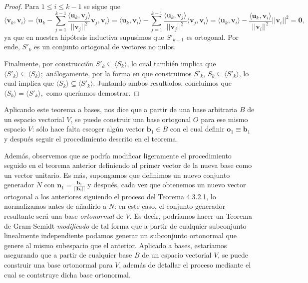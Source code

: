 \documentclass[12pt,dvipsnames]{article}
\newenvironment{teorema}[2][Teorema]{\begin{trivlist}
\item[\hskip \labelsep {\bfseries #1}\hskip \labelsep {\bfseries #2.}]}{\end{trivlist}}
\begin{document}
\begin{teorema} {4.3.2.1 (Gram-Schmidt)}
\begin{proof}
    Para $1\leq i\leq k-1$ se sigue que $$\langle\mathbf{v}_k,\mathbf{v}_i\rangle=\big \langle\mathbf{u}_k-\sum_{j=1}^{k-1}\frac{\langle\mathbf{u}_k,\mathbf{v}_j\rangle}{||\mathbf{v}_j||^2}\mathbf{v}_j,\mathbf{v}_i \big \rangle=\langle\mathbf{u}_k,\mathbf{v}_i\rangle-\sum_{j=1}^{k-1}\frac{\langle\mathbf{u}_k,\mathbf{v}_j\rangle}{||\mathbf{v}_j||^2}\langle\mathbf{v}_j,\mathbf{v}_i\rangle=\langle\mathbf{u}_k, \mathbf{v}_i\rangle-\frac{\langle\mathbf{u}_k,\mathbf{v}_i\rangle}{||\mathbf{v}_i||^2}||\mathbf{v}_i||^2=\mathbf{0},$$ ya que en nuestra hipótesis inductiva supusimos que $S'_{k-1}$ es ortogonal. Por ende, $S'_k$ es un conjunto ortogonal de vectores no nulos.

Finalmente, por construcción $S'_k\subseteq \langle S_k \rangle$, lo cual también implica que $\langle S'_k \rangle \subseteq \langle S_k \rangle;$ análogamente, por la forma en que construimos $S'_k$, $S_k\subseteq \langle S'_k \rangle$, lo cual implica que $\langle S_k \rangle \subseteq \langle S'_k \rangle.$ Juntando ambos resultados, concluimos que $\langle S_k \rangle = \langle S'_k \rangle ,$ como queríamos demostrar.

\end{proof}
    Aplicando este teorema a bases, nos dice que a partir de una base arbitraria $B$ de un espacio vectorial $V$, se puede construir una base ortogonal $O$ para ese mismo espacio $V$: sólo hace falta escoger algún vector $\mathbf{b}_1\in B$ con el cual definir $\mathbf{o}_1\equiv\mathbf{b}_1$ y después seguir el procedimiento descrito en el teorema. 

    Además, observemos que se podría modificar ligeramente el procedimiento seguido en el teorema anterior definiendo al primer vector de la nueva base como un vector unitario. Es más, supongamos que definimos un nuevo conjunto generador $N$ con $\mathbf{n}_1=\frac{\mathbf{b}_1}{||\mathbf{b}_1||}$ y después, cada vez que obtenemos un nuevo vector ortogonal a los anteriores siguiendo el proceso del Teorema 4.3.2.1, lo normalizamos antes de añadirlo a $N$: en este caso, el conjunto generador resultante será una base \emph{ortonormal} de $V$. Es decir, podríamos hacer un Teorema de Gram-Scmidt \emph{modificado} de tal forma que a partir de cualquier subconjunto linealmente independiente podamos generar un subconjunto ortonormal que genere al mismo subespacio que el anterior. Aplicado a bases, estaríamos asegurando que a partir de cualquier base $B$ de un espacio vectorial $V$, se puede construir una base ortonormal para $V$, además de detallar el proceso mediante el cual se contstruye dicha base ortonormal.  

\end{teorema}
\end{document}
